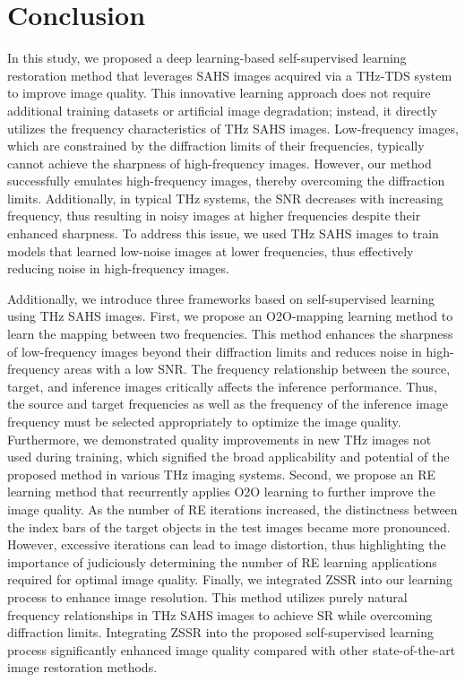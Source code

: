 \section{Conclusion}
In this study, we proposed a deep learning-based self-supervised learning restoration method that leverages SAHS images acquired via a THz-TDS system to improve image quality. This innovative learning approach does not require additional training datasets or artificial image degradation; instead, it directly utilizes the frequency characteristics of THz SAHS images. Low-frequency images, which are constrained by the diffraction limits of their frequencies, typically cannot achieve the sharpness of high-frequency images. However, our method successfully emulates high-frequency images, thereby overcoming the diffraction limits. Additionally, in typical THz systems, the SNR decreases with increasing frequency, thus resulting in noisy images at higher frequencies despite their enhanced sharpness. To address this issue, we used THz SAHS images to train models that learned low-noise images at lower frequencies, thus effectively reducing noise in high-frequency images.

Additionally, we introduce three frameworks based on self-supervised learning using THz SAHS images. First, we propose an O2O-mapping learning method to learn the mapping between two frequencies. This method enhances the sharpness of low-frequency images beyond their diffraction limits and reduces noise in high-frequency areas with a low SNR. The frequency relationship between the source, target, and inference images critically affects the inference performance. Thus, the source and target frequencies as well as the frequency of the inference image frequency must be selected appropriately to optimize the image quality. Furthermore, we demonstrated quality improvements in new THz images not used during training, which signified the broad applicability and potential of the proposed method in various THz imaging systems. Second, we propose an RE learning method that recurrently applies O2O learning to further improve the image quality. As the number of RE iterations increased, the distinctness between the index bars of the target objects in the test images became more pronounced. However, excessive iterations can lead to image distortion, thus highlighting the importance of judiciously determining the number of RE learning applications required for optimal image quality. Finally, we integrated ZSSR into our learning process to enhance image resolution. This method utilizes purely natural frequency relationships in THz SAHS images to achieve SR while overcoming diffraction limits. Integrating ZSSR into the proposed self-supervised learning process significantly enhanced image quality compared with other state-of-the-art image restoration methods.

